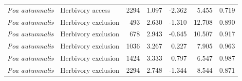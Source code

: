 \documentclass[12pt]{article}\usepackage[]{graphicx}\usepackage[dvipsnames]{xcolor}
\begin{document}
{\begin{landscape}
\begin{table}[ht]
\begin{tabular}{llrrrrr}
\textit{Poa autumnalis}    & Herbivory access    & 2294 & 1.097  & -2.362  & 5.455  & 0.719 \\
\textit{Poa autumnalis}    & Herbivory exclusion & 493  & 2.630  & -1.310  & 12.708 & 0.890 \\
\textit{Poa autumnalis}    & Herbivory exclusion & 678  & 2.943  & -0.645  & 10.507 & 0.917 \\
\textit{Poa autumnalis}    & Herbivory exclusion & 1036 & 3.267  & 0.227   & 7.905  & 0.963 \\
\textit{Poa autumnalis}    & Herbivory exclusion & 1424 & 3.333  & 0.797   & 6.547  & 0.987 \\
\textit{Poa autumnalis}    & Herbivory exclusion & 2294 & 2.748  & -1.344  & 8.544  & 0.871 \\
\hline
\end{tabular}
\end{table}
\end{landscape}

}
\end{document}
